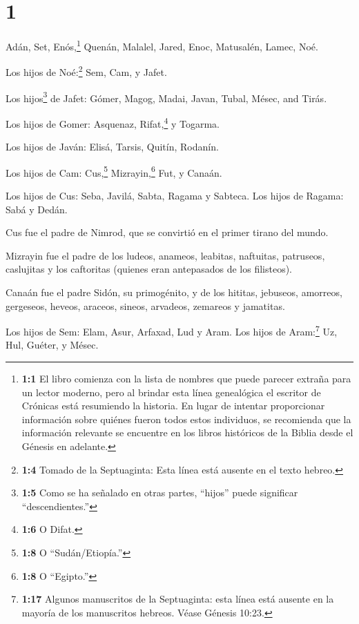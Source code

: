 \hypertarget{section}{%
\section{1}\label{section}}

 Adán, Set, Enós,\footnote{\textbf{1:1} El libro comienza
  con la lista de nombres que puede parecer extraña para un lector
  moderno, pero al brindar esta línea genealógica el escritor de
  Crónicas está resumiendo la historia. En lugar de intentar
  proporcionar información sobre quiénes fueron todos estos individuos,
  se recomienda que la información relevante se encuentre en los libros
  históricos de la Biblia desde el Génesis en adelante.} 
Quenán, Malalel, Jared,  Enoc, Matusalén, Lamec, Noé.

 Los hijos de Noé:\footnote{\textbf{1:4} Tomado de la
  Septuaginta: Esta línea está ausente en el texto hebreo.} Sem, Cam, y
Jafet.

 Los hijos\footnote{\textbf{1:5} Como se ha señalado en
  otras partes, ``hijos'' puede significar ``descendientes.''} de Jafet:
Gómer, Magog, Madai, Javan, Tubal, Mésec, and Tirás.

 Los hijos de Gomer: Asquenaz, Rifat,\footnote{\textbf{1:6}
  O Difat.} y Togarma.

 Los hijos de Javán: Elisá, Tarsis, Quitín, Rodanín.

 Los hijos de Cam: Cus,\footnote{\textbf{1:8} O
  ``Sudán/Etiopía.''} Mizrayin,\footnote{\textbf{1:8} O ``Egipto.''}
Fut, y Canaán.

 Los hijos de Cus: Seba, Javilá, Sabta, Ragama y Sabteca.
Los hijos de Ragama: Sabá y Dedán.

 Cus fue el padre de Nimrod, que se convirtió en el primer
tirano del mundo.

 Mizrayin fue el padre de los ludeos, anameos, leabitas,
naftuitas,  patruseos, caslujitas y los caftoritas (quienes
eran antepasados de los filisteos).

 Canaán fue el padre Sidón, su primogénito, y de los
hititas,  jebuseos, amorreos, gergeseos, 
heveos, araceos, sineos,  arvadeos, zemareos y jamatitas.

 Los hijos de Sem: Elam, Asur, Arfaxad, Lud y Aram. Los
hijos de Aram:\footnote{\textbf{1:17} Algunos manuscritos de la
  Septuaginta: esta línea está ausente en la mayoría de los manuscritos
  hebreos. Véase Génesis 10:23.} Uz, Hul, Guéter, y Mésec.

